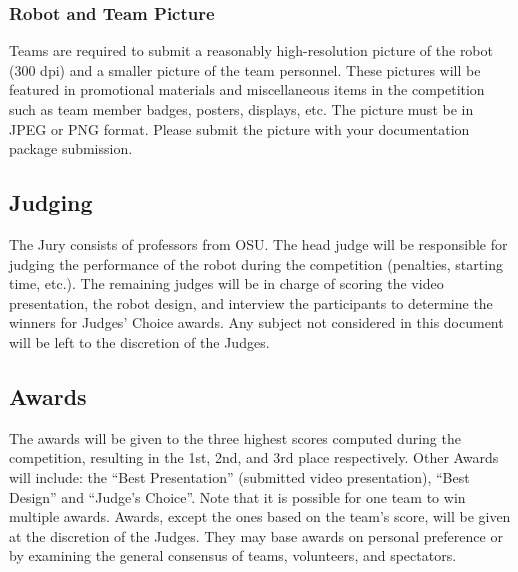 \subsubsection{Robot and Team Picture}
Teams are required to submit a reasonably high-resolution picture of the robot (300 dpi) and a smaller picture of the team personnel. These pictures will be featured in promotional materials and miscellaneous items in the competition such as team member badges, posters, displays, etc. The picture must be in JPEG or PNG format. Please submit the picture with your documentation package submission.

\subsection{Judging}
The Jury consists of professors from OSU. The head judge will be responsible for judging the performance of the robot during the competition (penalties, starting time, etc.). The remaining judges will be in charge of scoring the video presentation, the robot design, and interview the participants to determine the winners for Judges’ Choice awards. 
Any subject not considered in this document will be left to the discretion of the Judges.

\subsection{Awards}
The awards will be given to the three highest scores computed during the competition, resulting in the 1st, 2nd, and 3rd place respectively. Other Awards will include: the “Best Presentation” (submitted video presentation), “Best Design” and “Judge's Choice”. Note that it is possible for one team to win multiple awards. 
Awards, except the ones based on the team’s score, will be given at the discretion of the Judges. They may base awards on personal preference or by examining the general consensus of teams, volunteers, and spectators. 